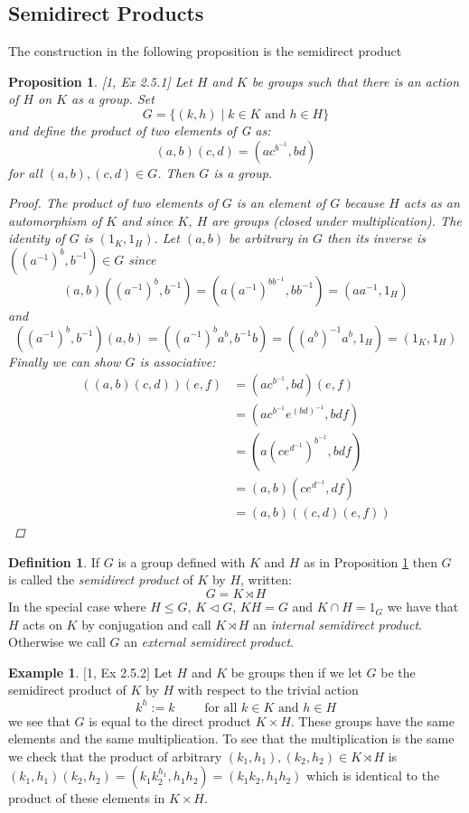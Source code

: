 \documentclass[]{article}
\newtheorem{prop}[thm]{Proposition}
\theoremstyle{definition}
\newtheorem{defn}[thm]{Definition}
\newtheorem{example}[thm]{Example}
\begin{document}
\subsection{Semidirect Products}
The construction in the following proposition is the semidirect product
\begin{prop} \label{prop:semidirect} \emph{[1, Ex 2.5.1]}
Let $H$ and $K$ be groups such that there is an action of $H$ on $K$ as a group. Set 
$$G = \{(k,h) \; | \; k \in K \mbox{ and } h \in H \}$$
and define the product of two elements of G as:
$$(a,b)(c,d)=(ac^{b^{-1}},bd)$$
for all $(a,b),(c,d) \in G$.
Then $G$ is a group.

\begin{proof}
	The product of two elements of $G$ is an element of $G$ because $H$ acts as an automorphism of $K$ and since $K$, $H$ are groups (closed under multiplication). The identity of $G$ is $(1_K,1_H)$. Let $(a,b)$ be arbitrary in $G$ then its inverse is $((a^{-1})^b,b^{-1}) \in G$ since $$(a,b) ((a^{-1})^b,b^{-1}) = (a(a^{-1})^{bb^{-1}},bb^{-1}) = (aa^{-1},1_H)$$
and
$$((a^{-1})^b,b^{-1})(a,b) = ((a^{-1})^b a^b,b^{-1}b) = ((a^b)^{-1}a^b,1_H) = (1_K,1_H)$$
Finally we can show $G$ is associative:
\begin{align*}
((a,b)(c,d))(e,f) & = (ac^{b^{-1}},bd)(e,f) \\
& =  (ac^{b^{-1}}e^{(bd)^{-1}},bdf) \\
& =  (a(ce^{d^{-1}})^{b^{-1}},bdf) \\
& =  (a,b)(ce^{d^{-1}},df) \\
& =  (a,b)((c,d)(e,f))
\end{align*}
\end{proof}	
\end{prop}

\begin{defn}
If $G$ is a group defined with $K$ and $H$ as in Proposition \ref{prop:semidirect} then $G$ is called the \emph{semidirect product} of $K$ by $H$, written:
$$G = K \rtimes H$$
In the special case where $H \leqslant G$, $K \vartriangleleft G$, $KH = G$ and $K \cap H = 1_G$ we have that $H$ acts on $K$ by conjugation and call $K \rtimes H$ an \emph{internal semidirect product}. Otherwise we call $G$ an \emph{external semidirect product}.
\end{defn}

\begin{example} 
	$[$1, Ex 2.5.2$]$ Let $H$ and $K$ be groups then if we let $G$ be the semidirect product of $K$ by $H$ with respect to the trivial action
	$$k^h:=k \qquad \mbox{ for all } k \in K \mbox{ and } h \in H$$
	we see that $G$ is equal to the direct product $K \times H$. These groups have the same elements and the same multiplication. To see that the multiplication is the same we check that the product of arbitrary $(k_1,h_1),(k_2,h_2) \in K \rtimes H$ is $(k_1,h_1)(k_2,h_2)=(k_1k_2^{h_1},h_1h_2)=(k_1k_2,h_1h_2)$ which is identical to the product of these elements in $K \times H$.
\end{example}
\end{document}
